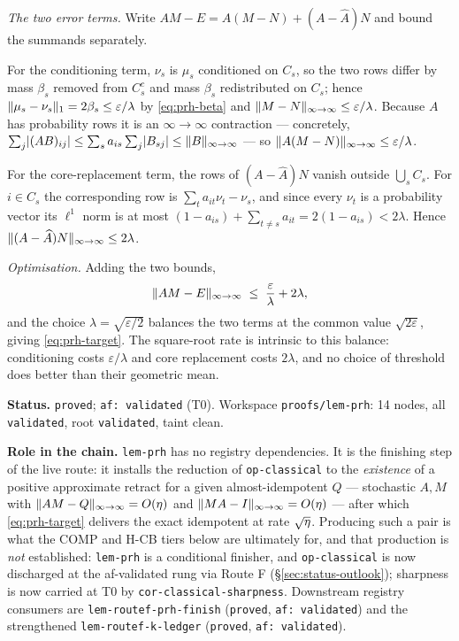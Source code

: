 \emph{The two error terms.} Write $AM-E=A(M-N)+(A-\widehat A)N$ and bound the summands
separately.

For the conditioning term, $\nu_s$ is $\mu_s$ conditioned on $C_s$, so the two rows differ
by mass $\beta_s$ removed from $C_s^c$ and mass $\beta_s$ redistributed on $C_s$; hence
$\lVert \mu_s-\nu_s \rVert_{1}=2\beta_s\le\varepsilon/\lambda$ by \eqref{eq:prh-beta} and
$\lVert M-N \rVert_{\infty\to\infty}\le\varepsilon/\lambda$. Because $A$ has probability rows it is an
$\infty\!\to\!\infty$ contraction --- concretely,
$\sum_j\lvert(AB)_{ij}\rvert\le\sum_s a_{is}\sum_j\lvert B_{sj}\rvert\le\lVert B \rVert_{\infty\to\infty}$ ---
so $\lVert A(M-N) \rVert_{\infty\to\infty}\le\varepsilon/\lambda$.

For the core-replacement term, the rows of $(A-\widehat A)N$ vanish outside
$\bigcup_sC_s$. For $i\in C_s$ the corresponding row is $\sum_t a_{it}\nu_t-\nu_s$, and
since every $\nu_t$ is a probability vector its $\ell^1$ norm is at most
$(1-a_{is})+\sum_{t\ne s}a_{it}=2(1-a_{is})<2\lambda$. Hence
$\lVert (A-\widehat A)N \rVert_{\infty\to\infty}\le2\lambda$.

\emph{Optimisation.} Adding the two bounds,
\[
  \lVert AM-E \rVert_{\infty\to\infty}\;\le\;\frac{\varepsilon}{\lambda}+2\lambda ,
\]
and the choice $\lambda=\sqrt{\varepsilon/2}$ balances the two terms at the common value
$\sqrt{2\varepsilon}$, giving \eqref{eq:prh-target}. The square-root rate is intrinsic to
this balance: conditioning costs $\varepsilon/\lambda$ and core replacement costs
$2\lambda$, and no choice of threshold does better than their geometric mean.

\medskip
\noindent\textbf{Status.} \texttt{proved}; \texttt{af: validated} (T0). Workspace
\texttt{proofs/lem-prh}: 14 nodes, all \texttt{validated}, root \texttt{validated}, taint
clean.

\noindent\textbf{Role in the chain.} \texttt{lem-prh} has no registry dependencies. It is
the finishing step of the live route: it installs the reduction of \texttt{op-classical}
to the \emph{existence} of a positive approximate retract for a given almost-idempotent
$Q$ --- stochastic $A,M$ with $\lVert AM-Q \rVert_{\infty\to\infty}=O(\eta)$ and $\lVert MA-I \rVert_{\infty\to\infty}=O(\eta)$ ---
after which \eqref{eq:prh-target} delivers the exact idempotent at rate $\sqrt{\eta}$.
Producing such a pair is what the COMP and H-CB tiers below are ultimately for, and that
production is \emph{not} established: \texttt{lem-prh} is a conditional finisher, and
\texttt{op-classical} is now discharged at the af-validated rung via Route F (\S\ref{sec:status-outlook}); sharpness is now carried at T0 by \texttt{cor-classical-sharpness}. Downstream registry consumers are
\texttt{lem-routef-prh-finish} (\texttt{proved}, \texttt{af: validated}) and the
strengthened \texttt{lem-routef-k-ledger} (\texttt{proved}, \texttt{af: validated}).

